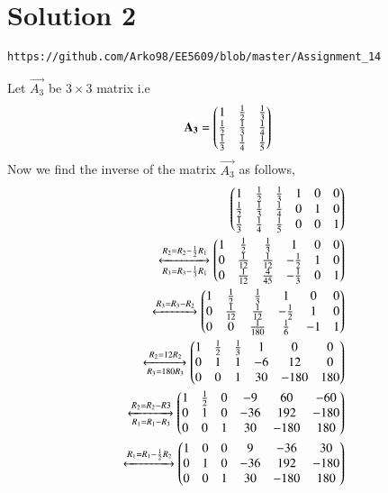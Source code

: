 \documentclass[journal,12pt,twocolumn]{IEEEtran}
\begin{document}
\section{\textbf{Solution 2}}
\begin{lstlisting}
https://github.com/Arko98/EE5609/blob/master/Assignment_14
\end{lstlisting}
\begin{comment}
Let $\vec{H_n}$ be the $n$-th Hilbert matrix given by
\begin{align}
\vec{H_n} &= \left[\frac1{i+j-1}\right]_{i,j}\\
\intertext{Then $\vec{H_{n+1}}$ is given by,}
\vec{H_{n+1}} &= \myvec{\vec{H_n}&\vec{u}\\\vec{u^T}&\frac{1}{2n-1}}
\end{align}
\end{comment}
Let $\vec{A_3}$ be $3 \times 3$ matrix i.e
\begin{align}
\mathbf{A_3} &= \begin{pmatrix}1&\frac{1}{2}&\frac{1}{3}\\\frac{1}{2}&\frac{1}{3}&\frac{1}{4}\\\frac{1}{3}&\frac{1}{4}&\frac{1}{5}\end{pmatrix}
\end{align}
Now we find the inverse of the matrix $\vec{A_3}$ as follows,
\begin{align}
\begin{pmatrix}1&\frac{1}{2}&\frac{1}{3}&1&0&0\\\frac{1}{2}&\frac{1}{3}&\frac{1}{4}&0&1&0\\\frac{1}{3}&\frac{1}{4}&\frac{1}{5}&0&0&1\end{pmatrix}\\
\xleftrightarrow[R_3 = R_3 - \frac{1}{3}R_1]{R_2 = R_2 - \frac{1}{2}R_1}\begin{pmatrix}1&\frac{1}{2}&\frac{1}{3}&1&0&0\\0&\frac{1}{12}&\frac{1}{12}&-\frac{1}{2}&1&0\\0&\frac{1}{12}&\frac{4}{45}&-\frac{1}{3}&0&1\end{pmatrix}\\
\xleftrightarrow[]{R_3 = R_3 - R_2}\begin{pmatrix}1&\frac{1}{2}&\frac{1}{3}&1&0&0\\0&\frac{1}{12}&\frac{1}{12}&-\frac{1}{2}&1&0\\0&0&\frac{1}{180}&\frac{1}{6}&-1&1\end{pmatrix}\\
\xleftrightarrow[R_3 = 180R_3]{R_2 = 12R_2}\begin{pmatrix}1&\frac{1}{2}&\frac{1}{3}&1&0&0\\0&1&1&-6&12&0\\0&0&1&30&-180&180\end{pmatrix}\\
\xleftrightarrow[R_1=R_1-R_3]{R_2 = R_2 - R3}\begin{pmatrix}1&\frac{1}{2}&0&-9&60&-60\\0&1&0&-36&192&-180\\0&0&1&30&-180&180\end{pmatrix}\\
\xleftrightarrow{R_1 =R_1-\frac{1}{2}R_2}\begin{pmatrix}1&0&0&9&-36&30\\0&1&0&-36&192&-180\\0&0&1&30&-180&180\end{pmatrix}
\end{align}
\end{document}
